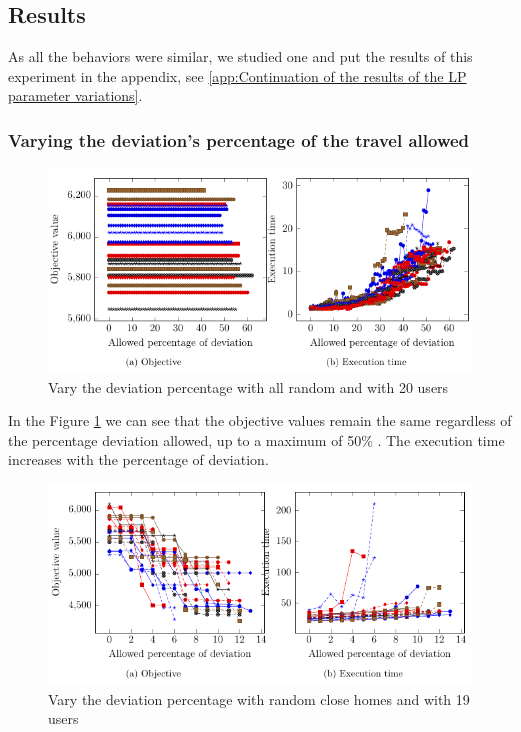 \documentclass[12pt, a4paper, twoside]{memoir}
\begin{document}
{	\subsection{Results}
	As all the behaviors were similar, we studied one and put the results of this experiment in the appendix, see \ref{app:Continuation of the results of the LP parameter variations}.
	\subsubsection{Varying the deviation's percentage of the travel allowed}

	\begin{figure}[H]
		\centering
		\begin{flushleft}
			\includegraphics[scale=0.9]{img/compiledResults/4.png}
		\end{flushleft}
		\caption{Vary the deviation percentage with all random and with 20 users}
		\label{fig:Vary the deviation percentage with all random and with 20 users}
	\end{figure}

	In the Figure \ref{fig:Vary the deviation percentage with all random and with 20 users} we can see that the objective values remain the same regardless of the percentage deviation allowed, up to a maximum of 50\% . The execution time increases with the percentage of deviation.
	
	\begin{figure}[H]
		\centering
		\begin{flushleft}
			\floatplacement{figure}{t}
			\includegraphics[scale=0.9]{img/compiledResults/7.png}
		\end{flushleft}
		\caption{Vary the deviation percentage with random close homes and with 19 users}
		\label{fig:Vary the deviation percentage with random close homes and with 19 users}
	\end{figure}
	
}
\end{document}
